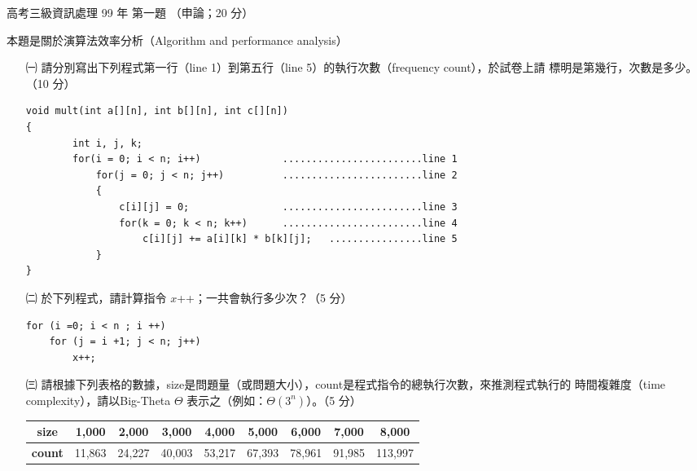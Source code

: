 \begin{pastexam}[label={px:gk3-099-ds-01}]{高考三級資訊處理 99 年 第一題}
（申論；20 分）

本題是關於演算法效率分析（Algorithm and performance analysis）
\begin{itemize}[leftmargin=2.2em]
\item[㈠] 請分別寫出下列程式第一行（line 1）到第五行（line 5）的執行次數（frequency count），於試卷上請
標明是第幾行，次數是多少。（10 分）
\begin{verbatim}
void mult(int a[][n], int b[][n], int c[][n])
{
        int i, j, k;
        for(i = 0; i < n; i++)              ........................line 1
            for(j = 0; j < n; j++)          ........................line 2
            {
                c[i][j] = 0;                ........................line 3
                for(k = 0; k < n; k++)      ........................line 4
                    c[i][j] += a[i][k] * b[k][j];   ................line 5
            }
}
\end{verbatim}
\item[㈡] 於下列程式，請計算指令 $x$++；一共會執行多少次？（5 分）
\begin{verbatim}
for (i =0; i < n ; i ++)
    for (j = i +1; j < n; j++)
        x++;
\end{verbatim}
\item[㈢] 請根據下列表格的數據，size是問題量（或問題大小），count是程式指令的總執行次數，來推測程式執行的
時間複雜度（time complexity），請以Big-Theta $\Theta$ 表示之（例如：$\Theta(3^n)$）。（5 分）

\begin{center}
\small
\setlength{\tabcolsep}{4pt}
\begin{tabular}{|c|c|c|c|c|c|c|c|c|}
\hline
\textbf{size} & 1,000 & 2,000 & 3,000 & 4,000 & 5,000 & 6,000 & 7,000 & 8,000 \\ \hline
\textbf{count} & 11,863 & 24,227 & 40,003 & 53,217 & 67,393 & 78,961 & 91,985 & 113,997 \\ \hline
\end{tabular}
\end{center}
\end{itemize}
\end{pastexam}

